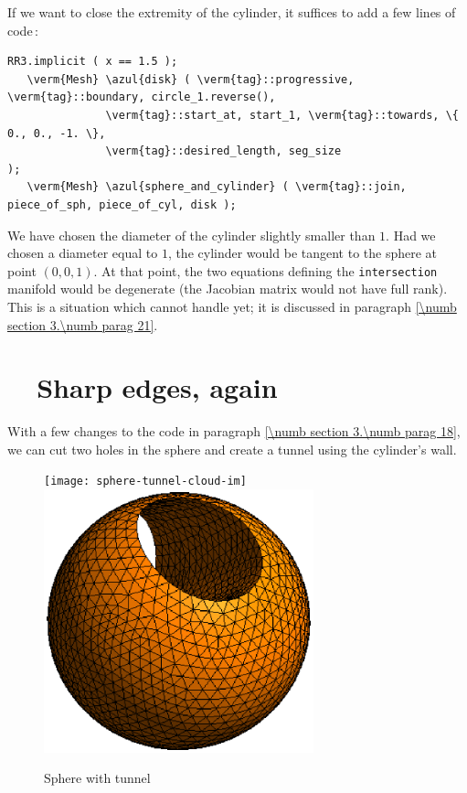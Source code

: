 If we want to close the extremity of the cylinder, it suffices to add a few lines of code$\,$:

\begin{Verbatim}[commandchars=\\\{\},formatcom=\small\tt,
   baselinestretch=0.94,framesep=2mm                     ]
   RR3.implicit ( x == 1.5 );
   \verm{Mesh} \azul{disk} ( \verm{tag}::progressive, \verm{tag}::boundary, circle_1.reverse(),
               \verm{tag}::start_at, start_1, \verm{tag}::towards, \{ 0., 0., -1. \},
               \verm{tag}::desired_length, seg_size                          );
   \verm{Mesh} \azul{sphere_and_cylinder} ( \verm{tag}::join, piece_of_sph, piece_of_cyl, disk );
\end{Verbatim}

We have chosen the diameter of the cylinder slightly smaller than $1$.
Had we chosen a diameter equal to $1$, the cylinder would be tangent to the sphere at point
$ (0,0,1) $.
At that point, the two equations defining the {\small\tt intersection} manifold would be
degenerate (the Jacobian matrix would not have full rank).
This is a situation which {\maniFEM} cannot handle yet; it is discussed in paragraph
\ref{\numb section 3.\numb parag 21}.


\section{~~Sharp edges, again}\label{\numb section 3.\numb parag 19}

With a few changes to the code in paragraph \ref{\numb section 3.\numb parag 18},
we can cut two holes in the sphere and create a tunnel using the cylinder's wall.
\medskip

\begin{figure}[ht] \centering
\if{}
 \texttt{[image: sphere-tunnel-cloud-im]}
\else
 \includegraphics[width=78mm]{sphere-tunnel-low-res}
\fi
  \caption{Sphere with tunnel}
  \label{\numb section 3.\numb fig 7}
\end{figure}

